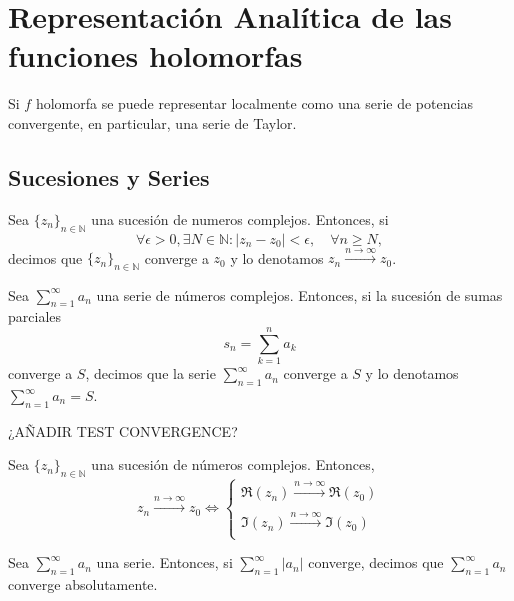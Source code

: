 \chapter{Representación Analítica de las funciones holomorfas}

\begin{note}
  Si $f$ holomorfa se puede representar localmente como una serie de potencias convergente, en particular, una serie de Taylor.
\end{note}

\section{Sucesiones y Series}

\begin{defn}
  Sea $\{ z_{n} \}_{n \in \mathbb{N}}$ una sucesión de numeros complejos. Entonces, si
  \[
    \forall \epsilon > 0, \exists N \in \mathbb{N}: | z_{n} - z_{0} | < \epsilon, \quad \forall n \geq N,
  \]
  decimos que $\{ z_{n} \}_{n \in \mathbb{N}}$ converge a $z_{0}$ y lo denotamos $z_{n} \xrightarrow[]{ n \rightarrow \infty } z_{0}$.
\end{defn}

\begin{defn}
  Sea $\sum_{n = 1}^{\infty} a_{n}$ una serie de números complejos. Entonces, si la sucesión de sumas parciales
  \[
    s_{n} = \sum_{k = 1}^{n} a_{k}
  \]
  converge a $S$, decimos que la serie $\sum_{n = 1}^{\infty} a_{n}$ converge a $S$ y lo denotamos $\sum_{n = 1}^{\infty} a_{n} = S$.
\end{defn}

¿AÑADIR TEST CONVERGENCE?

\begin{prop}
  Sea $\{ z_{n} \}_{n \in \mathbb{N}}$ una sucesión de números complejos. Entonces, 
  \[ 
    z_{n} \xrightarrow[]{ n \rightarrow \infty } z_{0} \Leftrightarrow 
    \begin{cases}
      \Re (z_{n}) \xrightarrow[]{ n \rightarrow \infty } \Re (z_{0}) \\
      \Im (z_{n}) \xrightarrow[]{ n \rightarrow \infty } \Im (z_{0})
    \end{cases} 
  \] 
\end{prop}

\begin{defn}
  Sea $\sum_{n = 1}^{\infty} a_{n}$ una serie. Entonces, si $\sum_{n = 1}^{\infty} |  a_{n} |$ converge, decimos que $ \sum_{n = 1}^{\infty} a_{n}$ converge absolutamente.
\end{defn}

